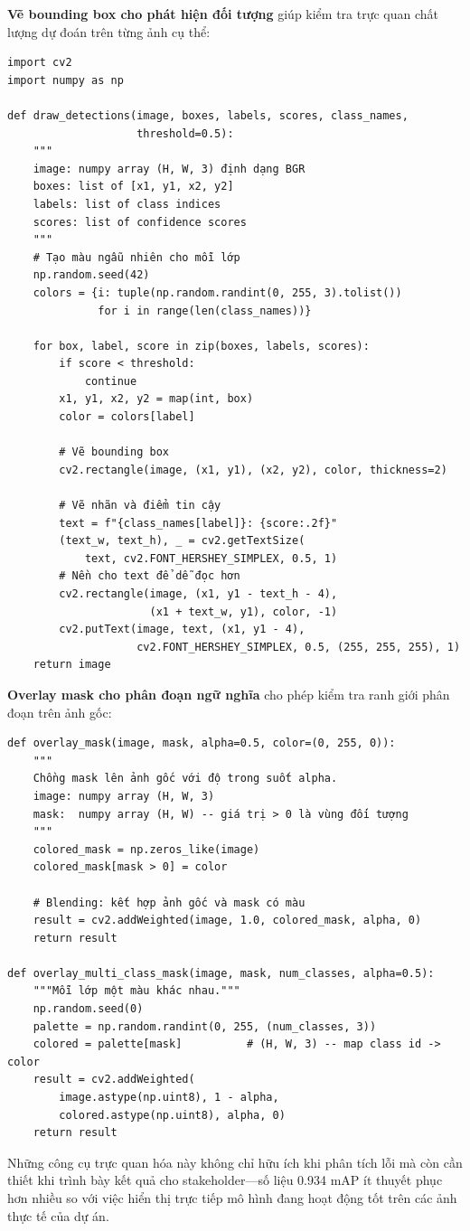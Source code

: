 \textbf{Vẽ bounding box cho phát hiện đối tượng} giúp kiểm tra trực quan chất lượng dự đoán trên từng ảnh cụ thể:

\begin{verbatim}
import cv2
import numpy as np

def draw_detections(image, boxes, labels, scores, class_names,
                    threshold=0.5):
    """
    image: numpy array (H, W, 3) định dạng BGR
    boxes: list of [x1, y1, x2, y2]
    labels: list of class indices
    scores: list of confidence scores
    """
    # Tạo màu ngẫu nhiên cho mỗi lớp
    np.random.seed(42)
    colors = {i: tuple(np.random.randint(0, 255, 3).tolist())
              for i in range(len(class_names))}

    for box, label, score in zip(boxes, labels, scores):
        if score < threshold:
            continue
        x1, y1, x2, y2 = map(int, box)
        color = colors[label]

        # Vẽ bounding box
        cv2.rectangle(image, (x1, y1), (x2, y2), color, thickness=2)

        # Vẽ nhãn và điểm tin cậy
        text = f"{class_names[label]}: {score:.2f}"
        (text_w, text_h), _ = cv2.getTextSize(
            text, cv2.FONT_HERSHEY_SIMPLEX, 0.5, 1)
        # Nền cho text để dễ đọc hơn
        cv2.rectangle(image, (x1, y1 - text_h - 4),
                      (x1 + text_w, y1), color, -1)
        cv2.putText(image, text, (x1, y1 - 4),
                    cv2.FONT_HERSHEY_SIMPLEX, 0.5, (255, 255, 255), 1)
    return image
\end{verbatim}

\textbf{Overlay mask cho phân đoạn ngữ nghĩa} cho phép kiểm tra ranh giới phân đoạn trên ảnh gốc:

\begin{verbatim}
def overlay_mask(image, mask, alpha=0.5, color=(0, 255, 0)):
    """
    Chồng mask lên ảnh gốc với độ trong suốt alpha.
    image: numpy array (H, W, 3)
    mask:  numpy array (H, W) -- giá trị > 0 là vùng đối tượng
    """
    colored_mask = np.zeros_like(image)
    colored_mask[mask > 0] = color

    # Blending: kết hợp ảnh gốc và mask có màu
    result = cv2.addWeighted(image, 1.0, colored_mask, alpha, 0)
    return result

def overlay_multi_class_mask(image, mask, num_classes, alpha=0.5):
    """Mỗi lớp một màu khác nhau."""
    np.random.seed(0)
    palette = np.random.randint(0, 255, (num_classes, 3))
    colored = palette[mask]          # (H, W, 3) -- map class id -> color
    result = cv2.addWeighted(
        image.astype(np.uint8), 1 - alpha,
        colored.astype(np.uint8), alpha, 0)
    return result
\end{verbatim}

Những công cụ trực quan hóa này không chỉ hữu ích khi phân tích lỗi mà còn cần thiết khi trình bày kết quả cho stakeholder---số liệu 0.934 mAP ít thuyết phục hơn nhiều so với việc hiển thị trực tiếp mô hình đang hoạt động tốt trên các ảnh thực tế của dự án.
